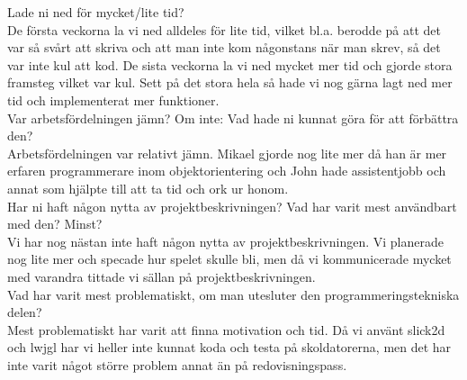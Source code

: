 {\color{red}Lade ni ned för mycket/lite tid?\\}
De första veckorna la vi ned alldeles för lite tid, vilket bl.a. berodde på att det var så svårt att skriva och att man inte kom någonstans när man skrev, så det var inte kul att kod. De sista veckorna la vi ned mycket mer tid och gjorde stora framsteg vilket var kul. Sett på det stora hela så hade vi nog gärna lagt ned mer tid och implementerat mer funktioner.\\

{\color{red}Var arbetsfördelningen jämn? Om inte: Vad hade ni kunnat göra för att förbättra den?\\}
Arbetsfördelningen var relativt jämn. Mikael gjorde nog lite mer då han är mer erfaren programmerare inom objektorientering och John hade assistentjobb och annat som hjälpte till att ta tid och ork ur honom.\\

{\color{red}Har ni haft någon nytta av projektbeskrivningen? Vad har varit mest användbart med den? Minst?\\}
Vi har nog nästan inte haft någon nytta av projektbeskrivningen. Vi planerade nog lite mer och specade hur spelet skulle bli, men då vi kommunicerade mycket med varandra tittade vi sällan på projektbeskrivningen. \\

{\color{red}Vad har varit mest problematiskt, om man utesluter den programmeringstekniska delen?\\}
Mest problematiskt har varit att finna motivation och tid. Då vi använt slick2d och lwjgl har vi heller inte kunnat koda och testa på skoldatorerna, men det har inte varit något större problem annat än på redovisningspass.\\
